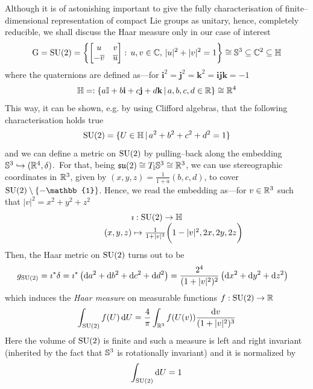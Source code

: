 Although it is of astonishing important to give the fully characterisation of finite--dimensional representation of compact Lie groups as unitary, hence, completely reducible, we shall discuss the Haar measure only in our case of interest 
$$\G=\SU(2)=\left\{\begin{bmatrix}
    u&v\\
    -\overline{v}&\overline{u}
\end{bmatrix}:\,u,v\in\C,\,|u|^2+|v|^2=1\right\}\cong\S^3\subseteq\C^2\subseteq\mathbb{H}$$
where the quaternions are defined as---for $\mathbf{i}^2=\mathbf{j}^2=\mathbf{k}^2=\mathbf{i}\mathbf{j}\mathbf{k}=-1$
$$\mathbb{H}=:\{a\mathbb{I}+b\mathbf{i}+c\mathbf{j}+d\mathbf{k}\,|\,a,b,c,d\in\R\}\cong\R^4$$
This way, it can be shown, e.g. by using Clifford algebras, that the following characterisation holds true
$$\SU(2)=\{U\in\mathbb{H}\,|\,a^2+b^2+c^2+d^2=1\}$$
and we can define a metric on $\SU(2)$ by pulling--back along the embedding $\S^3\hookrightarrow(\R^4,\delta)$.\, For that,
being $\su(2)\cong T_{\mathbb{I}}\S^3\cong\R^3$, we can use stereographic coordinates in $\R^3$, given by $(x,y,z)=\frac{1}{1+a}\left(b,c,d\right)$, to cover $\SU(2)\setminus\{-\mathbb{1}\}$. Hence, we read the embedding as---for $v\in\R^3$ such that $|v|^2=x^2+y^2+z^2$
$$\begin{matrix}
    \imath:\SU(2)\to\mathbb{H}\\
   \qquad\qquad(x,y,z)\mapsto\frac{1}{1+|v|^2}\bigg(1-|v|^2,2x,2y,2z\bigg)
\end{matrix}$$
Then, the Haar metric on $\SU(2)$ turns out to be
\begin{align*}
    g_{\SU(2)}&=\imath^*\delta=\imath^*\left(\d a^2+\d b^2+\d c^2+\d d^2\right)=\frac{2^4}{(1+|v|^2)^2}\left(\d x^2+\d y^2+\d z^2\right)
\end{align*}
which induces the \emph{Haar measure} on measurable functions $f:\SU(2)\to\R$
$$\int_{\SU(2)}f(U)\,\d U=\frac{4}{\pi}\int_{\R^3}f(U(v))\frac{\d v}{(1+|v|^2)^3}$$
Here the volume of $\SU(2)$ is finite and such a measure is left and right invariant (inherited by the fact that $\S^3$ is rotationally invariant) and it is normalized by
$$\int_{\SU(2)}\d U=1$$






